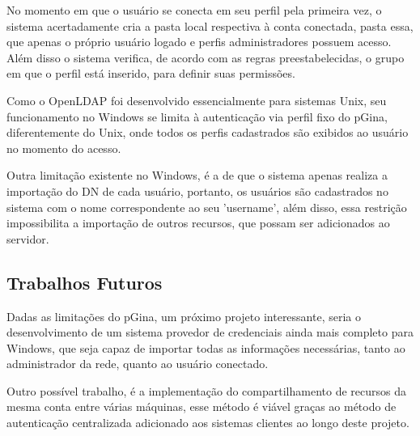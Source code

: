 No momento em que o usuário se conecta em seu perfil pela primeira vez, o sistema acertadamente cria a pasta local respectiva à conta conectada, pasta essa, que apenas o próprio usuário logado
e perfis administradores possuem acesso. Além disso o sistema verifica, de acordo com as regras preestabelecidas, o grupo em que o perfil está inserido, para definir suas permissões.

Como o OpenLDAP foi desenvolvido essencialmente para sistemas Unix, seu funcionamento no Windows se limita à autenticação via perfil fixo do pGina, diferentemente do Unix, onde todos os perfis cadastrados são exibidos ao usuário no momento do acesso.

Outra limitação existente no Windows, é a de que o sistema apenas realiza a importação do DN de cada usuário, portanto, os usuários são cadastrados no sistema com o nome correspondente ao seu 'username', além disso, essa restrição impossibilita a importação de outros recursos, que possam ser adicionados ao servidor.

\subsection{Trabalhos Futuros}

Dadas as limitações do pGina, um próximo projeto interessante, seria o desenvolvimento de um sistema provedor de credenciais ainda mais completo para Windows, que seja capaz de importar todas as informações necessárias, tanto ao administrador da rede, quanto ao usuário conectado.

Outro possível trabalho, é a implementação do compartilhamento de recursos da mesma conta entre várias máquinas, esse método é viável graças ao método de autenticação centralizada adicionado aos sistemas clientes ao longo deste projeto.
